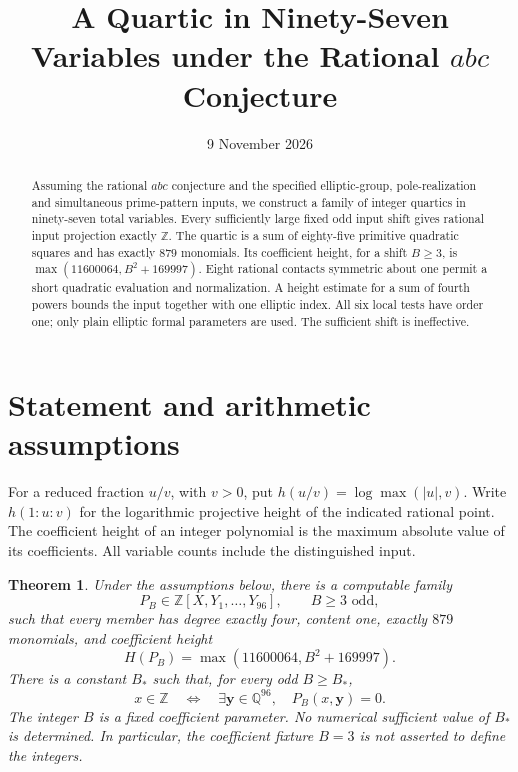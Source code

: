 \documentclass[11pt,a4paper]{article}
\title{A Quartic in Ninety-Seven Variables under the Rational $abc$ Conjecture}
\author{}\date{9 November 2026}
\newtheorem{theorem}{Theorem}[section]
\newcommand{\Q}{\mathbb Q}\newcommand{\Z}{\mathbb Z}
\begin{document}
\maketitle
\begin{abstract}
Assuming the rational $abc$ conjecture and the specified elliptic-group,
pole-realization and simultaneous prime-pattern inputs, we construct a
family of integer quartics in ninety-seven total variables. Every
sufficiently large fixed odd input shift gives rational input projection
exactly $\Z$. The quartic is a sum of eighty-five primitive quadratic
squares and has exactly $879$ monomials. Its coefficient height, for a
shift $B\ge3$, is $\max(11600064,B^2+169997)$. Eight rational contacts
symmetric about one permit a short quadratic evaluation and normalization.
A height estimate for a sum of fourth powers bounds the input together
with one elliptic index. All six local tests have order one; only plain
elliptic formal parameters are used. The sufficient shift is ineffective.
\end{abstract}

\section{Statement and arithmetic assumptions}

For a reduced fraction $u/v$, with $v>0$, put
$h(u/v)=\log\max(|u|,v)$. Write $h(1:u:v)$ for the logarithmic
projective height of the indicated rational point. The coefficient height
of an integer polynomial is the maximum absolute value of its coefficients.
All variable counts include the distinguished input.

\begin{theorem}\label{thm:main}
Under the assumptions below, there is a computable family
\[
 P_B\in\Z[X,Y_1,\ldots,Y_{96}],\qquad B\ge3\text{ odd},
\]
such that every member has degree exactly four, content one, exactly
$879$ monomials, and coefficient height
\[
 H(P_B)=\max(11600064,B^2+169997).
\]
There is a constant $B_*$ such that, for every odd $B\ge B_*$,
\[
 x\in\Z\quad\Longleftrightarrow\quad
 \exists\boldsymbol y\in\Q^{96},\quad P_B(x,\boldsymbol y)=0.
\]
The integer $B$ is a fixed coefficient parameter. No numerical sufficient
value of $B_*$ is determined. In particular, the coefficient fixture
$B=3$ is not asserted to define the integers.
\end{theorem}
\end{document}
